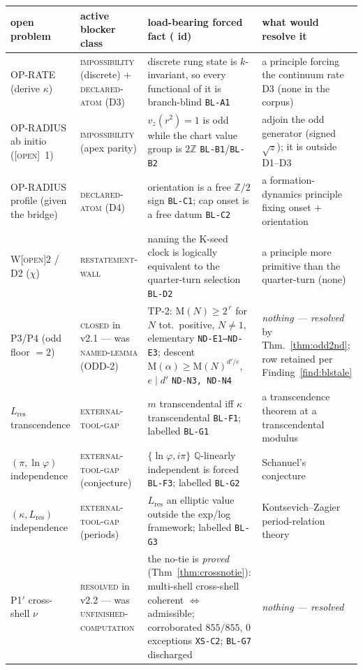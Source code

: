 \documentclass[11pt]{article}
\newcommand{\tagO}{\textcolor{cO}{\textsc{[open]}}}
\newcommand{\hx}[1]{\textcolor{cC}{\footnotesize\texttt{#1}}}
\newcommand{\Q}{\mathbb{Q}}
\newcommand{\Z}{\mathbb{Z}}
\newcommand{\gp}{\varphi}
\newcommand{\M}{\mathrm{M}}
\theoremstyle{plain}
\theoremstyle{definition}
\theoremstyle{remark}
\begin{document}
\begin{center}\footnotesize\setlength{\tabcolsep}{4pt}
\begin{tabular}{@{}p{2.5cm}p{2.7cm}p{4.05cm}p{4.5cm}@{}}
\toprule
open problem & active blocker class & load-bearing forced fact (\hx{} id) & what would resolve it\\
\midrule
OP-RATE (derive $\kappa$) & \textsc{impossibility} (discrete) $+$ \textsc{declared-atom} (D3) & discrete rung state is $k$-invariant, so every functional of it is branch-blind \hx{BL-A1} & a principle forcing the continuum rate D3 (none in the corpus)\\[2pt]
OP-RADIUS ab initio (\tagO{}~1) & \textsc{impossibility} (apex parity) & $v_z(r^2){=}1$ is odd while the chart value group is $2\Z$ \hx{BL-B1}/\hx{BL-B2} & adjoin the odd generator (signed $\sqrt z$); it is outside D1--D3\\[2pt]
OP-RADIUS profile (given the bridge) & \textsc{declared-atom} (D4) & orientation is a free $\Z/2$ sign \hx{BL-C1}; cap onset is a free datum \hx{BL-C2} & a formation-dynamics principle fixing onset $+$ orientation\\[2pt]
W\tagO{}2 / D2 ($\chi$) & \textsc{restatement-wall} & naming the K-seed clock is logically equivalent to the quarter-turn selection \hx{BL-D2} & a principle more primitive than the quarter-turn (none)\\[2pt]
P3/P4 (odd floor $=2$) & \textsc{closed} in v2.1 --- was \textsc{named-lemma} (ODD-2) & TP-2: $\M(N)\ge2^{\,r}$ for $N$ tot.\ positive, $N\neq1$, elementary \hx{ND-E1--ND-E3}; descent $\M(\alpha)\ge\M(N)^{d'/e}$, $e\mid d'$ \hx{ND-N3, ND-N4} & \emph{nothing --- resolved} by Thm.~\ref{thm:odd2nd}; row retained per Finding~\ref{find:blstale}\\[2pt]
$L_{\mathrm{res}}$ transcendence & \textsc{external-tool-gap} & $m$ transcendental iff $\kappa$ transcendental \hx{BL-F1}; labelled \hx{BL-G1} & a transcendence theorem at a transcendental modulus\\[2pt]
$(\pi,\ln\gp)$ independence & \textsc{external-tool-gap} (conjecture) & $\{\ln\gp,i\pi\}$ $\Q$-linearly independent is forced \hx{BL-F3}; labelled \hx{BL-G2} & Schanuel's conjecture\\[2pt]
$(\kappa,L_{\mathrm{res}})$ independence & \textsc{external-tool-gap} (periods) & $L_{\mathrm{res}}$ an elliptic value outside the exp/log framework; labelled \hx{BL-G3} & Kontsevich--Zagier period-relation theory\\[2pt]
P1$'$ cross-shell $\nu$ & \textsc{resolved} in v2.2 --- was \textsc{unfinished-computation} & the no-tie is \emph{proved} (Thm~\ref{thm:crossnotie}): multi-shell cross-shell coherent $\iff$ admissible; corroborated $855/855$, $0$ exceptions \hx{XS-C2}; \hx{BL-G7} discharged & \emph{nothing --- resolved}\\
\bottomrule
\end{tabular}
\end{center}
\end{document}

